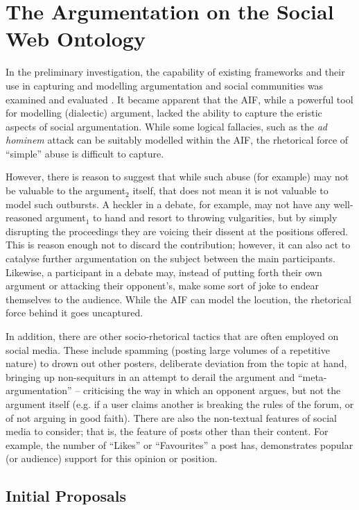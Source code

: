 \chapter{The Argumentation on the Social Web Ontology}
\label{aswo}
In the preliminary investigation, the capability of existing frameworks and their use in capturing and modelling argumentation and social communities was examined and evaluated \citep{Blount2014}. It became apparent that the AIF, while a powerful tool for modelling (dialectic) argument, lacked the ability to capture the eristic aspects of social argumentation. While some logical fallacies, such as the \textit{ad hominem} attack can be suitably modelled within the AIF, the rhetorical force of ``simple'' abuse is difficult to capture. 

However, there is reason to suggest that while such abuse (for example) may not be valuable to the argument$_2$ itself, that does not mean it is not valuable to model such outbursts. A heckler in a debate, for example, may not have any well-reasoned argument$_1$ to hand and resort to throwing vulgarities, but by simply disrupting the proceedings they are voicing their dissent at the positions offered. This is reason enough not to discard the contribution; however, it can also act to catalyse further argumentation on the subject between the main participants. Likewise, a participant in a debate may, instead of putting forth their own argument or attacking their opponent's, make some sort of joke to endear themselves to the audience. While the AIF can model the locution, the rhetorical force behind it goes uncaptured.

In addition, there are other socio-rhetorical tactics that are often employed on social media. These include spamming (posting large volumes of a repetitive nature) to drown out other posters, deliberate deviation from the topic at hand, bringing up non-sequiturs in an attempt to derail the argument and ``meta-argumentation'' -- criticising the way in which an opponent argues, but not the argument itself (e.g. if a user claims another is breaking the rules of the forum, or of not arguing in good faith). There are also the non-textual features of social media to consider; that is, the feature of posts other than their content. For example, the number of ``Likes'' or ``Favourites'' a post has, demonstrates popular (or audience) support for this opinion or position. 


\section{Initial Proposals}
\label{aswo:augmentations}

